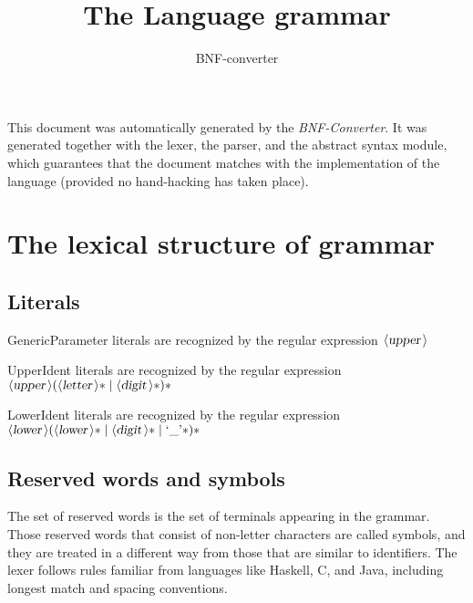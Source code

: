 \documentclass[a4paper,11pt]{article}
\author{BNF-converter}
\title{The Language grammar}
\begin{document}
\maketitle

\newcommand{\emptyP}{\mbox{$\epsilon$}}
\newcommand{\terminal}[1]{\mbox{{\texttt {#1}}}}
\newcommand{\nonterminal}[1]{\mbox{$\langle \mbox{{\sl #1 }} \! \rangle$}}
\newcommand{\arrow}{\mbox{::=}}
\newcommand{\delimit}{\mbox{$|$}}
\newcommand{\reserved}[1]{\mbox{{\texttt {#1}}}}
\newcommand{\literal}[1]{\mbox{{\texttt {#1}}}}
\newcommand{\symb}[1]{\mbox{{\texttt {#1}}}}

This document was automatically generated by the {\em BNF-Converter}. It was generated together with the lexer, the parser, and the abstract syntax module, which guarantees that the document matches with the implementation of the language (provided no hand-hacking has taken place).

\section*{The lexical structure of grammar}

\subsection*{Literals}








GenericParameter literals are recognized by the regular expression
\({\nonterminal{upper}}\)

UpperIdent literals are recognized by the regular expression
\({\nonterminal{upper}} ({\nonterminal{letter}}* \mid {\nonterminal{digit}}*)*\)

LowerIdent literals are recognized by the regular expression
\({\nonterminal{lower}} ({\nonterminal{lower}}* \mid {\nonterminal{digit}}* \mid \mbox{`\_'}*)*\)


\subsection*{Reserved words and symbols}
The set of reserved words is the set of terminals appearing in the grammar. Those reserved words that consist of non-letter characters are called symbols, and they are treated in a different way from those that are similar to identifiers. The lexer follows rules familiar from languages like Haskell, C, and Java, including longest match and spacing conventions.
\end{document}
